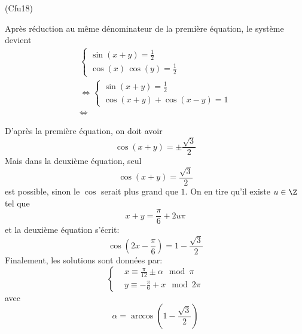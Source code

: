 \begin{tiny}(Cfu18)\end{tiny} Après réduction au même dénominateur de la première équation, le système devient
\begin{multline*}
\left\lbrace 
\begin{aligned}
\sin(x+y) = \frac{1}{2} \\ \cos(x) \, \cos(y) = \frac{1}{2}  
\end{aligned}
\right. \\
\Leftrightarrow
\left\lbrace 
\begin{aligned}
\sin(x+y) = \frac{1}{2} \\ \cos(x+y) + \cos(x-y) = 1  
\end{aligned}
\right. \\
\Leftrightarrow
\end{multline*}

D'après la première équation, on doit avoir 
\begin{displaymath}
  \cos(x+y) = \pm \frac{\sqrt{3}}{2}
\end{displaymath}
Mais dans la deuxième équation, seul
\begin{displaymath}
  \cos(x+y) = \frac{\sqrt{3}}{2}
\end{displaymath}
est possible, sinon le $\cos$ serait plus grand que $1$. On en tire qu'il existe $u\in \Z$ tel que
\begin{displaymath}
  x+y = \frac{\pi}{6} + 2u\pi
\end{displaymath}
et la deuxième équation s'écrit:
\begin{displaymath}
\cos(2x-\frac{\pi}{6})=1-\frac{\sqrt{3}}{2}  
\end{displaymath}
Finalement, les solutions sont données par:
\begin{displaymath}
\left\lbrace 
\begin{aligned}
&x \equiv \frac{\pi}{12} \pm \alpha \mod \pi \\
&y \equiv -\frac{\pi}{6} + x \mod 2\pi
\end{aligned}
\right. 
\end{displaymath}
avec
\begin{displaymath}
  \alpha = \arccos(1-\frac{\sqrt{3}}{2})
\end{displaymath}
